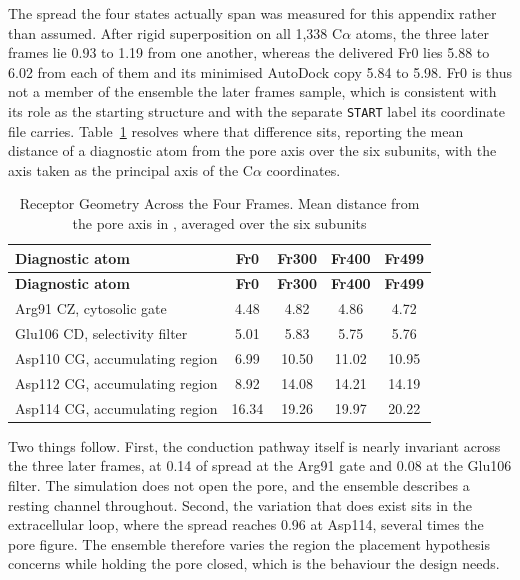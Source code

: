 The spread the four states actually span was measured for this appendix rather than assumed. After rigid superposition on all 1,338 C\ensuremath{\alpha} atoms, the three later frames lie 0.93 to 1.19\angstrom{} from one another, whereas the delivered Fr0 lies 5.88 to 6.02\angstrom{} from each of them and its minimised AutoDock copy 5.84 to 5.98\angstrom{}. Fr0 is thus not a member of the ensemble the later frames sample, which is consistent with its role as the starting structure and with the separate \texttt{START} label its coordinate file carries. Table~\ref{tab:appendix-frame-geometry} resolves where that difference sits, reporting the mean distance of a diagnostic atom from the pore axis over the six subunits, with the axis taken as the principal axis of the C\ensuremath{\alpha} coordinates.

\begingroup
\scriptsize
\begin{longtable}[]{@{}lcccc@{}}
\caption[Receptor Geometry Across the Four Frames]{Receptor Geometry Across the Four Frames. Mean distance from the pore axis in \angstrom{}, averaged over the six subunits}\label{tab:appendix-frame-geometry}\tabularnewline
\toprule\noalign{}
\textbf{Diagnostic atom} & \textbf{Fr0} & \textbf{Fr300} & \textbf{Fr400} & \textbf{Fr499} \\
\midrule\noalign{}
\endfirsthead
\toprule\noalign{}
\textbf{Diagnostic atom} & \textbf{Fr0} & \textbf{Fr300} & \textbf{Fr400} & \textbf{Fr499} \\
\midrule\noalign{}
\endhead
\bottomrule\noalign{}
\endlastfoot
Arg91 CZ, cytosolic gate & 4.48 & 4.82 & 4.86 & 4.72 \\
Glu106 CD, selectivity filter & 5.01 & 5.83 & 5.75 & 5.76 \\
Asp110 CG, accumulating region & 6.99 & 10.50 & 11.02 & 10.95 \\
Asp112 CG, accumulating region & 8.92 & 14.08 & 14.21 & 14.19 \\
Asp114 CG, accumulating region & 16.34 & 19.26 & 19.97 & 20.22 \\
\end{longtable}
\endgroup

Two things follow. First, the conduction pathway itself is nearly invariant across the three later frames, at 0.14\angstrom{} of spread at the Arg91 gate and 0.08\angstrom{} at the Glu106 filter. The simulation does not open the pore, and the ensemble describes a resting channel throughout. Second, the variation that does exist sits in the extracellular loop, where the spread reaches 0.96\angstrom{} at Asp114, several times the pore figure. The ensemble therefore varies the region the placement hypothesis concerns while holding the pore closed, which is the behaviour the design needs.

